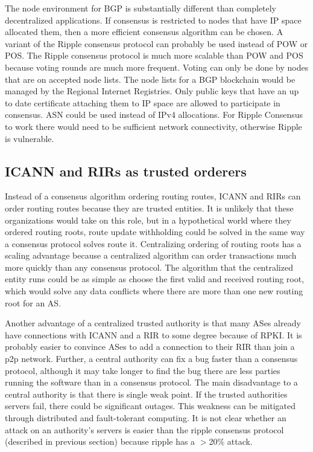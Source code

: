\documentclass[letterpaper, 10 pt, conference]{ieeeconf}  %
\begin{document}
The node environment for BGP is substantially different than completely decentralized applications. If consensus is restricted to nodes that have IP space allocated them, then a more efficient consensus algorithm can be chosen. A variant of the Ripple consensus protocol can probably be used instead of POW or POS. The Ripple consensus protocol is much more scalable than POW and POS because voting rounds are much more frequent. Voting can only be done by nodes that are on accepted node lists. The node lists for a BGP blockchain would be managed by the Regional Internet Registries. Only public keys that have an up to date certificate attaching them to IP space are allowed to participate in consensus. ASN could be used instead of IPv4 allocations. For Ripple Consensus to work there would need to be sufficient network connectivity, otherwise Ripple is vulnerable.

\subsection{ICANN and RIRs as trusted orderers}

Instead of a consensus algorithm ordering routing routes, ICANN and RIRs can order routing routes because they are trusted entities. It is unlikely that these organizations would take on this role, but in a hypothetical world where they ordered routing roots, route update withholding could be solved in the same way a consensus protocol solves route it. Centralizing ordering of routing roots has a scaling advantage because a centralized algorithm can order transactions much more quickly than any consensus protocol. The algorithm that the centralized entity runs could be as simple as choose the first valid and received routing root, which would solve any data conflicts where there are more than one new routing root for an AS. 

Another advantage of a centralized trusted authority is that many ASes already have connections with ICANN and a RIR to some degree because of RPKI. It is probably easier to convince ASes to add a connection to their RIR than join a p2p network. Further, a central authority can fix a bug faster than a consensus protocol, although it may take longer to find the bug there are less parties running the software than in a consensus protocol. The main disadvantage to a central authority is that there is single weak point. If the trusted authorities servers fail, there could be significant outages. This weakness can be mitigated through distributed and fault-tolerant computing. It is not clear whether an attack on an authority's servers is easier than the ripple consensus protocol (described in previous section) because ripple has a $>$20\% attack.
\end{document}
